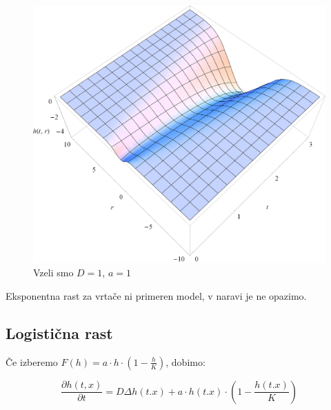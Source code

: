 \documentclass[a4paper, oneside, 12pt]{book}
\begin{document}
            \begin{figure}[H]
              \begin{center}
                \includegraphics[width=14cm]{slike/difuzija-eksponentna-rast2}
              \end{center}
              \caption{Vzeli smo $D=1$, $a=1$}
              \label{fig:difuzija-eksponentna-rast}
            \end{figure}

            Eksponentna rast za vrtače ni primeren model, v naravi je ne opazimo.


          \subsection{Logistična rast}

          Če izberemo $F(h) = a \cdot h \cdot (1 - \frac{h}{K})$, dobimo:

            \begin{equation}
              \frac{ \partial h(t,x) }{ \partial t} = D \Delta h(t.x) + a \cdot h(t.x) \cdot (1 - \frac{h(t.x)}{K})
              \label{difuzija-logisticna-rast}
            \end{equation}
\end{document}
